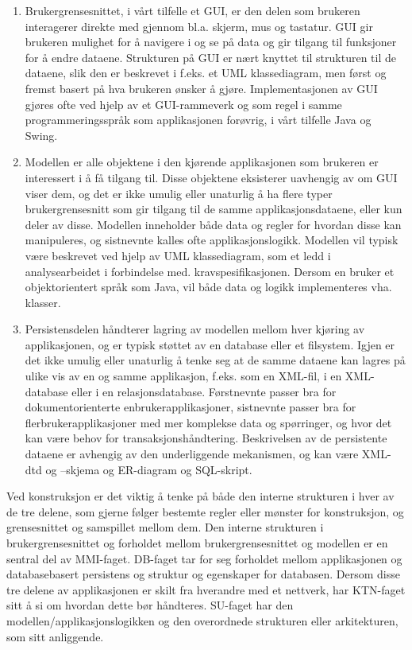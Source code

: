 \documentclass[a4paper]{scrartcl}
\begin{document}
\begin{enumerate}

\item
Brukergrensesnittet, i vårt tilfelle et GUI, er den delen som brukeren interagerer direkte med gjennom bl.a. skjerm, mus og tastatur. GUI gir brukeren mulighet for å navigere i og se på data og gir tilgang til funksjoner for å endre dataene. Strukturen på GUI er nært knyttet til strukturen til de dataene, slik den er beskrevet i f.eks. et UML klassediagram, men først og fremst basert på hva brukeren ønsker å gjøre. Implementasjonen av GUI gjøres ofte ved hjelp av et GUI-rammeverk og som regel i samme programmeringsspråk som applikasjonen forøvrig, i vårt tilfelle Java og Swing.

\item
Modellen er alle objektene i den kjørende applikasjonen som brukeren er interessert i å få tilgang til. Disse objektene eksisterer uavhengig av om GUI viser dem, og det er ikke umulig eller unaturlig å ha flere typer brukergrensesnitt som gir tilgang til de samme applikasjonsdataene, eller kun deler av disse. Modellen inneholder både data og regler for hvordan disse kan manipuleres, og sistnevnte kalles ofte applikasjonslogikk. Modellen vil typisk være beskrevet ved hjelp av UML klassediagram, som et ledd i analysearbeidet i forbindelse med. kravspesifikasjonen. Dersom en bruker et objektorientert språk som Java, vil både data og logikk implementeres vha. klasser. 

\item
Persistensdelen håndterer lagring av modellen mellom hver kjøring av applikasjonen, og er typisk støttet av en database eller et filsystem. Igjen er det ikke umulig eller unaturlig å tenke seg at de samme dataene kan lagres på ulike vis av en og samme applikasjon, f.eks. som en XML-fil, i en XML-database eller i en relasjonsdatabase. Førstnevnte passer bra for dokumentorienterte enbrukerapplikasjoner, sistnevnte passer bra for flerbrukerapplikasjoner med mer komplekse data og spørringer, og hvor det kan være behov for transaksjonshåndtering. Beskrivelsen av de persistente dataene er avhengig av den underliggende mekanismen, og kan være XML-dtd og –skjema og ER-diagram og SQL-skript.

\end{enumerate}

Ved konstruksjon er det viktig å tenke på både den interne strukturen i hver av de tre delene, som gjerne følger bestemte regler eller mønster for konstruksjon, og grensesnittet og samspillet mellom dem. Den interne strukturen i brukergrensesnittet og forholdet mellom brukergrensesnittet og modellen er en sentral del av MMI-faget. DB-faget tar for seg forholdet mellom applikasjonen og databasebasert persistens og struktur og egenskaper for databasen. Dersom disse tre delene av applikasjonen er skilt fra hverandre med et nettverk, har KTN-faget sitt å si om hvordan dette bør håndteres. SU-faget har den modellen/applikasjonslogikken og den overordnede strukturen eller arkitekturen, som sitt anliggende.
\end{document}
